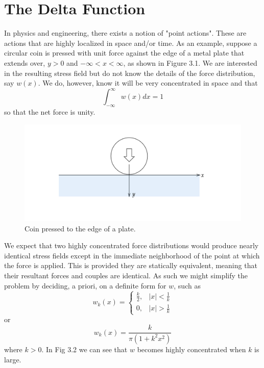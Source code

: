 \section{The Delta Function}
In physics and engineering, there exists a notion of "point actions". These are actions that are highly localized in space and/or time. As an example, suppose a circular coin is pressed with unit force against the edge of a metal plate that extends over, \(y>0\) and \(-\infty < x < \infty\), as shown in Figure 3.1. We are interested in the resulting stress field but do not know the details of the force distribution, say \(w(x)\). We do, however, know it will be very concentrated in space and that 
\begin{equation}
    \int_{-\infty}^{\infty} w(x) dx = 1
\end{equation}
so that the net force is unity.

\begin{figure}[H]
    \centering
    \includegraphics[width=0.7\linewidth]{3.1.png}
    \caption{Coin pressed to the edge of a plate.}
\end{figure}

We expect that two highly concentrated force distributions would produce nearly identical stress fields except in the immediate neighborhood of the point at which the force is applied. This is provided they are statically equivalent, meaning that their resultant forces and couples are identical. As such we might simplify the problem by deciding, a priori, on a definite form for \(w\), such as
\begin{equation}
    w_k(x) = \begin{cases}
        \frac{k}{2}, & |x|<\frac{1}{k}\\
        0, & |x|>\frac{1}{k}
    \end{cases}
\end{equation}
or
\begin{equation}
    w_k(x)=\frac{k}{\pi (1+k^2x^2)}
\end{equation}
where \(k>0\). In Fig 3.2 we can see that \(w\) becomes highly concentrated when \(k\) is large.

